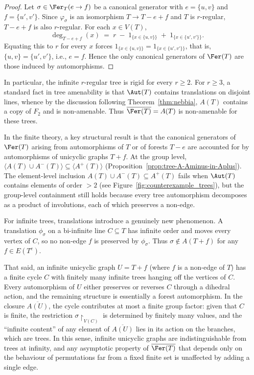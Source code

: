 \begin{proof}
    Let $\sigma\in\Fer_T(e\to f)$ be a canonical generator with $e=\{u,v\}$ and $f=\{u',v'\}$.
    Since $\varphi_\sigma$ is an isomorphism $T\to T-e+f$ and $T$ is $r$-regular, $T-e+f$ is also $r$-regular.
    For each $x\in V(T)$,
    $$
        \deg_{T-e+f}(x)\;=\;r\;-\;1_{\{x\in\{u,v\}\}}\;+\;1_{\{x\in\{u',v'\}\}}.
    $$
    Equating this to $r$ for every $x$ forces $1_{\{x\in\{u,v\}\}}=1_{\{x\in\{u',v'\}\}}$, that is, $\{u,v\}=\{u',v'\}$, i.e., $e=f$.
    Hence the only canonical generators of $\Fer(T)$ are those induced by automorphisms.
\end{proof}

In particular, the infinite $r$-regular tree is rigid for every $r\geq 2$.
For $r\geq 3$, a standard fact in tree amenability is that $\Aut(T)$ contains translations on disjoint lines, whence by the discussion following Theorem~\ref{thm:nebbia}, $A(T)$ contains a copy of $F_2$ and is non-amenable.
Thus $\overline{\Fer(T)}=A(T)$ is non-amenable for these trees.

In the finite theory, a key structural result is that the canonical generators of $\Fer(T)$ arising from automorphisms of $T$ or of forests $T-e$ are accounted for by automorphisms of unicyclic graphs $T+f$.
At the group level, $\langle A(T)\cup A^-(T)\rangle\subseteq\langle A^+(T)\rangle$ (Proposition~\ref{prop:tree-A-Aminus-in-Aplus}).
The element-level inclusion $A(T)\cup A^-(T)\subseteq A^+(T)$ fails when $\Aut(T)$ contains elements of order $>2$ (see Figure~\ref{fig:counterexample_trees}), but the group-level containment still holds because every tree automorphism decomposes as a product of involutions, each of which preserves a non-edge.

For infinite trees, translations introduce a genuinely new phenomenon.
A translation $\phi_\sigma$ on a bi-infinite line $C\subseteq T$ has infinite order and moves every vertex of $C$, so no non-edge $f$ is preserved by $\phi_\sigma$.
Thus $\sigma\notin A(T+f)$ for any $f\in E(T^c)$.

That said, an infinite unicyclic graph $U=T+f$ (where $f$ is a non-edge of $T$) has a finite cycle $C$ with finitely many infinite trees hanging off the vertices of $C$.
Every automorphism of $U$ either preserves or reverses $C$ through a dihedral action, and the remaining structure is essentially a forest automorphism.
In the closure $\overline{A(U)}$, the cycle contributes at most a finite group factor: given that $C$ is finite, the restriction $\sigma\restriction_{V(C)}$ is determined by finitely many values, and the ``infinite content'' of any element of $\overline{A(U)}$ lies in its action on the branches, which are trees.
In this sense, infinite unicyclic graphs are indistinguishable from trees at infinity, and any asymptotic property of $\overline{\Fer(T)}$ that depends only on the behaviour of permutations far from a fixed finite set is unaffected by adding a single edge.

